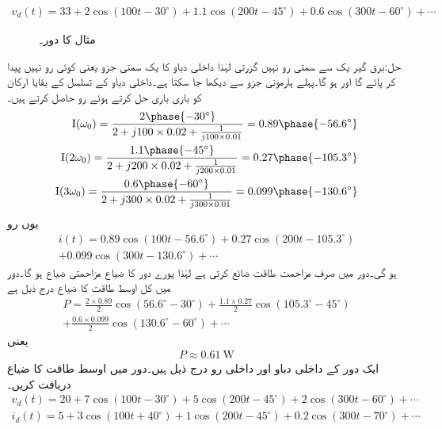 \begin{align*}
v_d(t)=33+2\cos(100t-30^{\circ})+1.1\cos(200t-45^{\circ})+0.6\cos(300t-60^{\circ})+\cdots
\end{align*}
%
\begin{figure}
\centering
{}
\caption{مثال  کا دور۔}
\label{شکل_فوریئر_اوسط_طاقت_الف}
\end{figure}

حل:برق گیر یک سے سمتی رو نہیں گزرتی لہٰذا داخلی دباو کا یک سمتی جزو یعنی  کوئی رو نہیں پیدا کر پائے گا اور  ہو گا۔پہلے ہارمونی جزو سے  دیکھا جا سکتا ہے۔داخلی دباو کے تسلسل کے بقایا ارکان کو باری باری حل کرتے  ہوئے رو حاصل کرتے ہیں۔
\begin{align*}
\bI(\omega_0)=\frac{2\phase{-30^{\circ}}}{2+j100\times 0.02+\frac{1}{j100\times 0.01}}=0.89\phase{-56.6^{\circ}}\\
\bI(2\omega_0)=\frac{1.1\phase{-45^{\circ}}}{2+j200\times 0.02+\frac{1}{j200\times 0.01}}=0.27\phase{-105.3^{\circ}}\\
\bI(3\omega_0)=\frac{0.6\phase{-60^{\circ}}}{2+j300\times 0.02+\frac{1}{j300\times 0.01}}=0.099\phase{-130.6^{\circ}}
\end{align*}
یوں رو
\begin{multline*}
i(t)=0.89\cos(100t-56.6^{\circ})+0.27\cos(200t-105.3^{\circ})\\
+0.099\cos(300t-130.6^{\circ})+\cdots
\end{multline*}
ہو گی۔دور میں صرف مزاحمت طاقت ضائع کرتی ہے لہٰذا پورے دور کا ضیاع مزاحمتی ضیاع ہو گا۔دور میں کل اوسط طاقت کا ضیاع درج ذیل ہے
\begin{multline*}
P=\frac{2\times 0.89}{2}\cos(56.6^{\circ}-30^{\circ})+\frac{1.1\times 0.27}{2}\cos(105.3^{\circ}-45^{\circ})\\
+\frac{0.6\times 0.099}{2}\cos(130.6^{\circ}-60^{\circ})+\cdots
\end{multline*}
یعنی
\begin{align*}
P\approx\SI{0.61}{\watt}
\end{align*}
ایک دور کے داخلی دباو اور داخلی رو درج ذیل ہیں۔دور میں اوسط طاقت کا ضیاع دریافت کریں۔
\begin{align*}
v_d(t)=20+7\cos(100t-30^{\circ})+5\cos(200t-45^{\circ})+2\cos(300t-60^{\circ})+\cdots\\
i_d(t)=5+3\cos(100t+40^{\circ})+1\cos(200t-45^{\circ})+0.2\cos(300t-70^{\circ})+\cdots
\end{align*}

